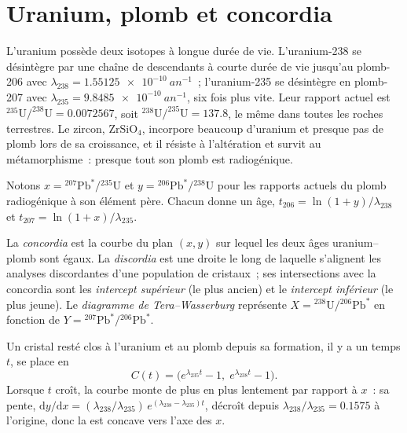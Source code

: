 \section{Uranium, plomb et concordia}\label{sec:b3:advanced-geochronology:upb}

L'uranium possède deux isotopes à longue durée de vie. L'uranium-238 se désintègre par une chaîne
de descendants à courte durée de vie jusqu'au plomb-206 avec $\lambda_{238} =
\qty{1.55125e-10}{an^{-1}}$~; l'uranium-235 se désintègre en plomb-207 avec $\lambda_{235}
= \qty{9.8485e-10}{an^{-1}}$, six fois plus vite. Leur rapport actuel est
$^{235}\mathrm{U}/^{238}\mathrm{U} = 0.0072567$, soit $^{238}\mathrm{U}/^{235}\mathrm{U}
= 137.8$, le même dans toutes les roches terrestres. Le zircon, $\mathrm{ZrSiO_4}$, incorpore
beaucoup d'uranium et presque pas de plomb lors de sa croissance, et il résiste à l'altération
et survit au métamorphisme~: presque tout son plomb est radiogénique.

Notons $x = {}^{207}\mathrm{Pb}^*/{}^{235}\mathrm{U}$ et $y =
{}^{206}\mathrm{Pb}^*/{}^{238}\mathrm{U}$ pour les rapports actuels du plomb radiogénique
à son élément père. Chacun donne un âge, $t_{206} = \ln(1 + y)/\lambda_{238}$
et $t_{207} = \ln(1 + x)/\lambda_{235}$.

\begin{definition}
\label{def:b3:advanced-geochronology:concordia}
La \emph{concordia} est la courbe du plan $(x, y)$ sur
lequel les deux âges uranium--plomb sont égaux. La \emph{discordia}
est une droite le long de laquelle s'alignent les analyses discordantes d'une population
de cristaux~; ses intersections avec la concordia sont les
\emph{intercept supérieur} (le plus ancien) et le
\emph{intercept inférieur} (le plus jeune). Le
\emph{diagramme de Tera--Wasserburg} représente
$X = {}^{238}\mathrm{U}/{}^{206}\mathrm{Pb}^*$ en fonction de $Y =
{}^{207}\mathrm{Pb}^*/{}^{206}\mathrm{Pb}^*$.
\end{definition}

\begin{theorem}[La concordia]\label{thm:b3:advanced-geochronology:concordia}
Un cristal resté clos à l'uranium et au plomb depuis sa formation, il y a
un temps $t$, se place en
\[
C(t) = \bigl(e^{\lambda_{235}t} - 1,\; e^{\lambda_{238}t} - 1\bigr).
\]
Lorsque $t$ croît, la courbe monte de plus en plus lentement par rapport à $x$~: sa pente,
$\mathrm dy/\mathrm dx = (\lambda_{238}/\lambda_{235})\,e^{(\lambda_{238} -
\lambda_{235})t}$, décroît depuis $\lambda_{238}/\lambda_{235} = 0.1575$ à
l'origine, donc la  est concave vers l'axe des $x$.
\end{theorem}

